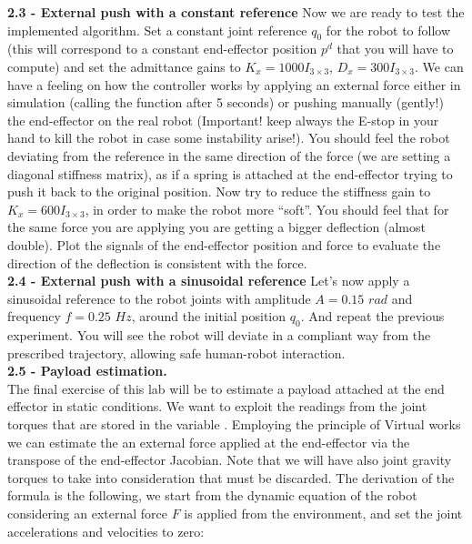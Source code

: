 \documentclass[11pt]{article}
\begin{document}
\textbf{2.3 - External push with a constant reference}
Now we are ready to test the implemented algorithm. Set  a constant joint reference $q_0$  for the robot to follow (this will correspond to a constant end-effector position $p^d$ that you will have to compute) and set the admittance gains to $K_x = 1000I_{3\times3}$,  $D_x = 300I_{3\times3}$. We can have a feeling  on how the controller works by applying an external force either in simulation (calling the function  after 5 seconds) or pushing manually (gently!) the end-effector on the real robot (Important! keep always the E-stop in your hand to kill the robot in case some instability arise!). You should feel the robot deviating from the reference in the same direction of the force (we are setting a diagonal stiffness matrix), as if a spring is attached at the end-effector trying to push it back to the original position. 
Now try to reduce the stiffness gain to $K_x = 600I_{3\times3}$, in order to make the robot more ``soft''. You should feel that for the same force you are applying you are getting a bigger deflection (almost double).
Plot the signals of the end-effector position and force to evaluate the direction of the deflection is consistent with the force.\\

\textbf{2.4 - External push with a sinusoidal reference}
Let's now apply a sinusoidal reference to the robot joints  with amplitude $A= 0.15$ $rad$ and frequency $f = 0.25$ $Hz$, around the initial position $q_0$.
And repeat the previous experiment. You will see the robot will deviate in a compliant way from the prescribed trajectory, allowing safe human-robot interaction.\\



 
 
\textbf{2.5 - Payload estimation.}\\
The final exercise of this lab will be to estimate a payload attached at the end effector in static conditions. We want to exploit the readings from the  joint torques that are stored in the variable . Employing the principle of Virtual works we can estimate the an external force applied at the end-effector via the transpose of the end-effector Jacobian. Note that we will have also joint gravity torques to take into consideration that must be discarded.
The derivation of the formula is the following, we start from the dynamic equation of the robot considering an external force $F$ is applied from the environment, and set the joint accelerations and velocities to zero:
\end{document}
